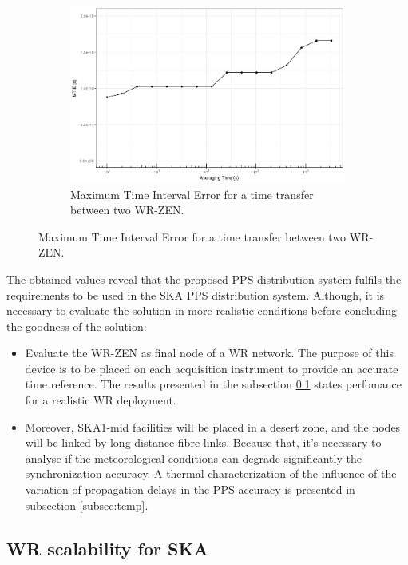 \begin{figure}
	\begin{subfigure}[t]{0.48\textwidth}
		\includegraphics[width=\textwidth]{img/MTIE_exp1}
		\caption[MTIE plot for the WR-ZEN]{Maximum Time Interval Error for a 
		time transfer between two WR-ZEN.}
		\label{fig:mtie_exp1}
	\end{subfigure}
\end{figure}

The obtained values reveal that the proposed PPS distribution system fulfils 
the requirements to be used in the SKA PPS distribution system. Although, it is 
necessary to evaluate the solution in more realistic conditions before 
concluding the goodness of the solution:

\begin{itemize}
	\item Evaluate the WR-ZEN as final node of a WR network. The purpose of 
	this device is to be placed on each acquisition instrument to provide an 
	accurate time reference. The results presented in the subsection 
	\ref{subsec: net_exp} states perfomance for a realistic WR deployment.
	
	\item Moreover, SKA1-mid facilities will be placed in a desert zone, and 
	the nodes will be linked by long-distance fibre links. Because that, it's 
	necessary to analyse if the meteorological conditions can degrade 
	significantly the synchronization accuracy. A thermal characterization of 
	the influence of the variation of propagation delays in the PPS accuracy is 
	presented in subsection \ref{subsec:temp}.
\end{itemize}   

\subsection{WR scalability for SKA} %
\label{subsec: net_exp}

